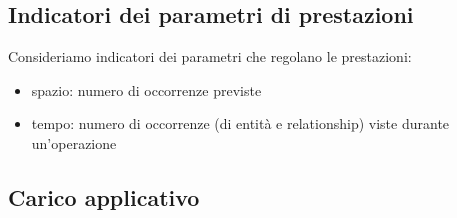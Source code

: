 \subsection*{Indicatori dei parametri di prestazioni}
Consideriamo indicatori dei parametri che regolano le prestazioni:
\begin{itemize}
    \item spazio: numero di occorrenze previste
    \item tempo: numero di occorrenze (di entità e relationship) viste durante un'operazione
\end{itemize}
\subsection{Carico applicativo}


